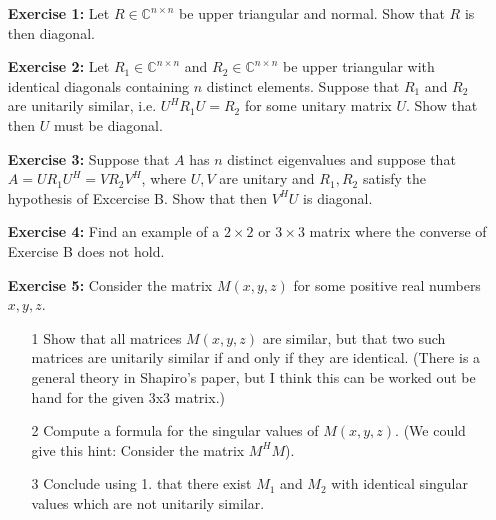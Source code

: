 \documentclass[14pt]{report}
\begin{document}
\begin{enumerate}
  \item[\textbf{Exercise 1:}] Let $R\in\mathbb{C}^{n\times n}$ be upper 
    triangular and normal. Show that $R$ is then diagonal. 

  \item[\textbf{Exercise 2:}] Let $R_1\in\mathbb{C}^{n\times n}$ and
    $R_2\in\mathbb{C}^{n\times n}$ be upper triangular with identical diagonals
    containing $n$ distinct elements. Suppose that $R_1$ and $R_2$ are 
    unitarily similar, i.e. $U^HR_1U = R_2$ for some unitary matrix $U$.
    Show that then $U$ must be diagonal.

  \item[\textbf{Exercise 3:}] Suppose that $A$ has $n$ distinct eigenvalues and
    suppose that $A = U R_1 U^H = V R_2 V^H$, where $U,V$ are unitary and 
    $R_1, R_2$ satisfy the hypothesis of Excercise B. Show that then $V^H U$ is
    diagonal.

  \item[\textbf{Exercise 4:}] Find an example of a $2\times2$ or $3\times3$
    matrix where the converse of Exercise B does not hold.

  \item[\textbf{Exercise 5:}] Consider the matrix $M(x,y,z)$ for some positive
    real numbers $x,y,z$.
    \begin{enumerate}
      \item[1] Show that all matrices $M(x,y,z)$ are similar, but that two such
        matrices are unitarily similar if and only if they are identical.
        (There is a general theory in Shapiro's paper, but I think this can be
        worked out be hand for the given 3x3 matrix.)
      \item[2] Compute a formula for the singular values of $M(x,y,z)$. 
        (We could give this hint: Consider the matrix $M^H M$).
      \item[3] Conclude using 1. that there exist $M_1$ and $M_2$ with
        identical singular values which are not unitarily similar.
      \end{enumerate}
  

\end{enumerate}
\end{document}
